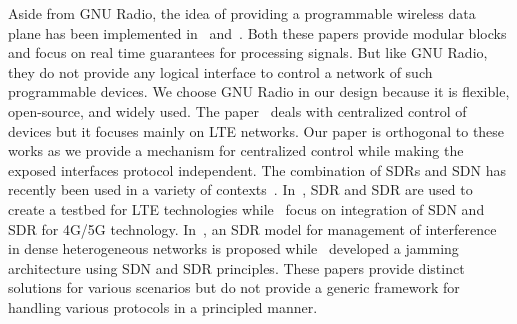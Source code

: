 Aside from GNU Radio, the idea of providing a programmable wireless data plane has been implemented in~\cite{atomix} and~\cite{openradio}. Both these papers provide modular blocks and focus on real time guarantees for processing signals. But like GNU Radio, they do not provide any logical interface to control a network of such programmable devices. We choose GNU Radio in our design because it is flexible, open-source, and widely used. The paper~\cite{softran} deals with centralized control of devices but it focuses mainly on LTE networks. Our paper is orthogonal to these works as we provide a mechanism for centralized control while making the exposed interfaces protocol independent.
The combination of SDRs and SDN has recently been used in a variety of contexts~\cite{cho2014integration, sun2015integrating,mancuso2014prototyping,corbett2014countering}. In~\cite{mancuso2014prototyping}, SDR and SDR are used to create a testbed for LTE technologies while~\cite{cho2014integration, sun2015integrating} focus on integration of SDN and SDR for 4G/5G technology. In~\cite{gupta2015labview}, an SDR model for management of interference in dense heterogeneous networks is proposed while~\cite{corbett2014countering} developed a jamming architecture using SDN and SDR principles. These papers provide distinct solutions for various scenarios but do not provide a generic framework for handling various protocols in a principled manner.
